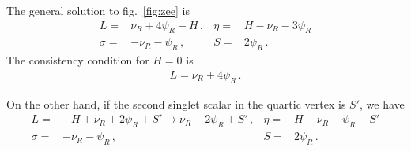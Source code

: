 \documentclass[12pt]{article}
\begin{document}
The general solution to fig.~\ref{fig:zee} is
\begin{align}
  L=&\nu_R+4\psi_R -H \,,& \eta=& H-\nu_R-3\psi_R \nonumber\\
  \sigma=& -\nu_R-\psi_R\,,&S=& 2\psi_R \,.
\end{align}
The consistency condition for $H=0$ is
\begin{align}
  L=\nu_R+4\psi_R\,.
\end{align}

On the other hand, if the second singlet scalar in the quartic vertex is $S'$, we have
\begin{align}
  L=&-H+\nu_R+2\psi_R+S'\to \nu_R+2\psi_R+S'\,, &
  \eta=&H-\nu_R-\psi_R-S' \nonumber\\
  \sigma=& -\nu_R-\psi_R\,,&S=& 2\psi_R \,.
\end{align}



%
%
%

%

\end{document}
